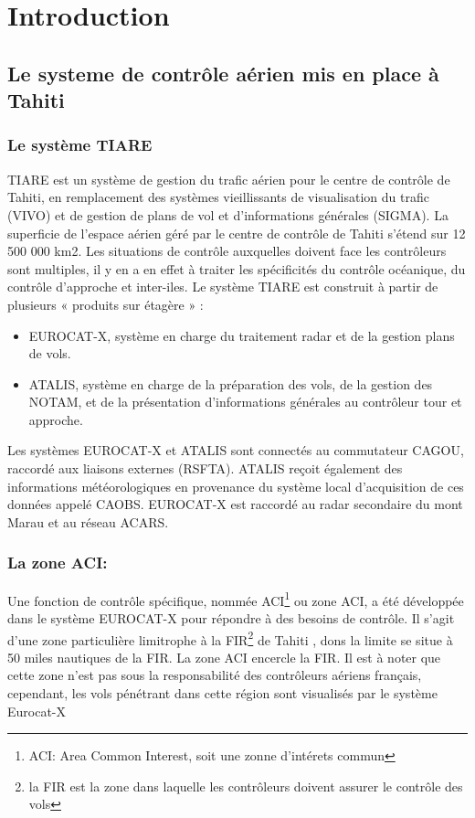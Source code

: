 
\section{Introduction}
    \subsection[Controle aérien a Thaiti]{Le systeme de contrôle aérien mis en place à Tahiti}
        \subsubsection{Le système TIARE}
TIARE est un système de gestion du trafic aérien pour le centre de contrôle de Tahiti, en remplacement des systèmes vieillissants de visualisation du trafic (VIVO) et de gestion de plans de vol et d’informations générales (SIGMA). La superficie de l'espace aérien géré par le centre de contrôle de Tahiti s’étend sur 12 500 000 km2. Les situations de contrôle auxquelles doivent face les contrôleurs sont multiples, il y en a en effet à traiter les spécificités du contrôle océanique, du contrôle d’approche et inter-iles. Le système TIARE est construit à partir de plusieurs « produits sur étagère » :
\begin{itemize}
\item EUROCAT-X, système en charge du traitement radar et de la gestion plans de vols.
\item ATALIS, système en charge de la préparation des vols, de la gestion des NOTAM, et de la présentation d’informations générales au contrôleur tour et approche.
\end{itemize}

Les systèmes EUROCAT-X et ATALIS sont connectés au commutateur CAGOU, raccordé aux liaisons externes (RSFTA). ATALIS reçoit également des informations météorologiques en provenance du système local d’acquisition de ces données appelé CAOBS. EUROCAT-X est raccordé au radar secondaire du mont Marau et au réseau ACARS.

        \subsubsection{La zone ACI:\label{Aci}}
Une fonction de contrôle spécifique, nommée ACI\footnote{ACI: Area Common Interest, soit une zonne d'intérets commun} ou zone ACI, a été développée dans le système EUROCAT-X pour répondre à des besoins de contrôle. Il s’agit d’une zone particulière limitrophe à la FIR\footnote{\label{FIR} la FIR est la zone dans laquelle les contrôleurs doivent assurer le contrôle des vols} de Tahiti , dons la limite se situe à 50 miles nautiques de la FIR. La zone ACI encercle la FIR. Il est à noter que cette zone n’est pas sous la responsabilité des contrôleurs aériens français, cependant, les vols pénétrant dans cette région sont visualisés par le système Eurocat-X 


